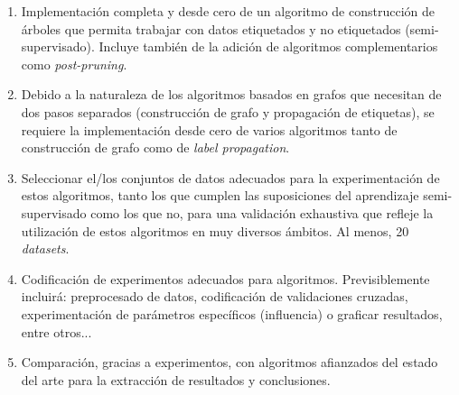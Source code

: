 \begin{enumerate}[label=\destacado{\arabic*.}]
  \setlength\itemsep{2em}
  \item Implementación completa y desde cero de un algoritmo de construcción de árboles que permita trabajar con datos etiquetados y no etiquetados (semi-supervisado). Incluye también de la adición de algoritmos complementarios como \textit{post-pruning}.
  \item Debido a la naturaleza de los algoritmos basados en grafos que necesitan de dos pasos separados (construcción de grafo y propagación de etiquetas), se requiere la implementación desde cero de varios algoritmos tanto de construcción de grafo como de \textit{label propagation}.
  \item Seleccionar el/los conjuntos de datos adecuados para la experimentación de estos algoritmos, tanto los que cumplen las suposiciones del aprendizaje semi-supervisado como los que no, para una validación exhaustiva que refleje la utilización de estos algoritmos en muy diversos ámbitos. Al menos, 20 \textit{datasets}.
  \item Codificación de experimentos adecuados para algoritmos. Previsiblemente incluirá: preprocesado de datos, codificación de validaciones cruzadas, experimentación de parámetros específicos (influencia) o graficar resultados, entre otros...
  \item Comparación, gracias a experimentos, con algoritmos afianzados del estado del arte para la extracción de resultados y conclusiones.
\end{enumerate}


